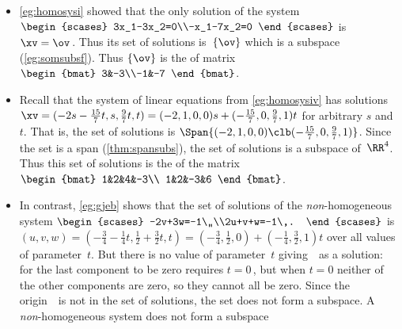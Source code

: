 \begin{example} \label{eg:nullsp}
\begin{itemize}
\item  \cref{eg:homosysi} showed that the only solution of the  system \(\begin{scases}
3x_1-3x_2=0\\-x_1-7x_2=0
\end{scases}\) is \(\xv=\ov\)\,.
Thus its set of solutions is~\(\{\ov\}\) which is a subspace (\cref{eg:somsubsf}).
Thus \(\{\ov\}\) is the  of matrix \(\begin{bmat} 3&-3\\-1&-7 \end{bmat}\).

\item Recall that the  system of linear equations from \cref{eg:homosysiv} has solutions \(\xv=(-2s-\frac{15}7t,s,\frac97t,t) =(-2,1,0,0)s+(-\frac{15}7,0,\frac97,1)t\) for arbitrary \(s\) and~\(t\).
That is, the set of solutions is \(\Span\{(-2,1,0,0)\clb (-\frac{15}7,0,\frac97,1)\}\).
Since the set is a span (\cref{thm:spansubs}), the set of solutions is a subspace of~\(\RR^4\).
Thus this set of solutions is the  of the matrix \(\begin{bmat} 1&2&4&-3\\
1&2&-3&6 \end{bmat}\).

\item In contrast, \cref{eg:gjeb} shows that the set of solutions of the \emph{non}-homogeneous system \(\begin{scases}
-2v+3w=-1\,,\\2u+v+w=-1\,.
\end{scases}\)
is \((u,v,w)=(-\frac34-\frac14t,\frac12+\frac32t,t)
=(-\frac34,\frac12,0)+(-\frac14,\frac32,1)t\)
over all values of parameter~\(t\).
But there is no value of parameter~\(t\) giving~\ov\ as a solution: for the last component to be zero requires \(t=0\)\,, but when \(t=0\) neither of the other components are zero, so they cannot all be zero.
Since the origin~\ov\ is not in the set of solutions, the set does not form a subspace. 
A \emph{non}-homogeneous system does not form a subspace 
\end{itemize}
\end{example}


